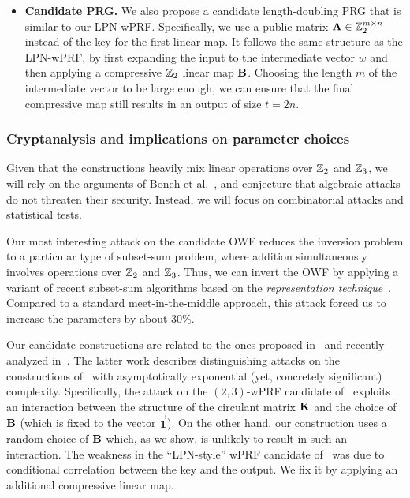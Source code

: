 \begin{itemize}
    \item \textbf{Candidate PRG.}
    We also propose a candidate length-doubling PRG that is similar to our LPN-wPRF. Specifically, we use a public matrix $\mat{A} \in \Z_2^{m \times n}$ instead of the key for the first linear map. It follows the same structure as the LPN-wPRF, by first expanding the input to the intermediate vector $w$ and then applying a compressive $\mathbb{Z}_2$ linear map $\mat{B}$. Choosing the length $m$ of the intermediate vector to be large enough, we can ensure that the final compressive map still results in an output of size $t = 2n$.
\end{itemize}

\subsubsection{Cryptanalysis and implications on parameter choices}

Given that the constructions heavily mix linear operations over $\mathbb{Z}_2$ and $\mathbb{Z}_3$, we will rely on the arguments of Boneh et al.~\cite{boneh2018-darkmatter}, and conjecture that algebraic attacks do not threaten their security. Instead, we will focus on combinatorial attacks and statistical tests.

Our most interesting attack on the candidate OWF reduces the inversion problem to a particular type of subset-sum problem, where addition simultaneously involves operations over $\mathbb{Z}_2$ and $\mathbb{Z}_3$. Thus, we can invert the OWF by applying a variant of recent subset-sum algorithms based on the \emph{representation technique}~\cite{Howgrave-GrahamJ10,BeckerCJ11,BonnetainBSS20}. Compared to a standard meet-in-the-middle approach, this attack forced us to increase the parameters by about $30\%$.

Our candidate constructions are related to the ones proposed in~\cite{boneh2018-darkmatter}
and recently analyzed in~\cite{cheon2020-adventures}.
The latter work describes distinguishing attacks on the constructions of~\cite{boneh2018-darkmatter}
with asymptotically exponential (yet, concretely significant) complexity.
Specifically, the attack on the $(2,3)$-wPRF candidate of~\cite{boneh2018-darkmatter} exploits an interaction
between the structure of the circulant matrix $\mat{K}$ and the choice of $\mat{B}$
(which is fixed to the vector $\vec{\textbf{1}}$).
On the other hand, our construction uses a random choice of $\mat{B}$ which, as we show, is
unlikely to result in such an interaction.
The weakness in the ``LPN-style'' wPRF candidate of~\cite{boneh2018-darkmatter}
was due to conditional correlation between the key and the output. We fix it by applying an additional compressive linear map.

